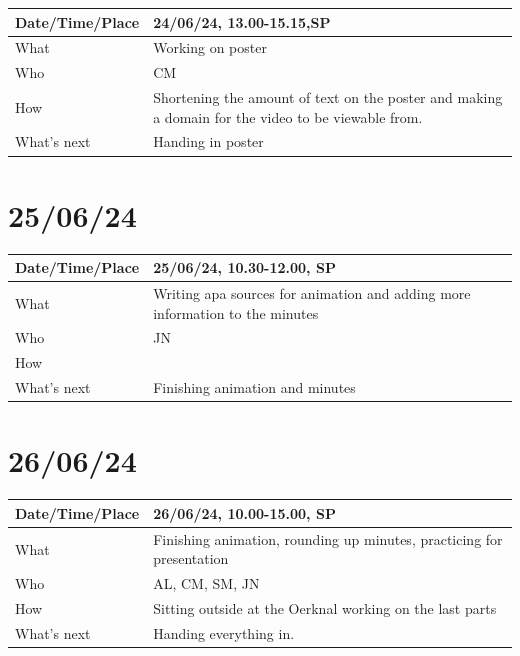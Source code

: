 \documentclass{article}
\begin{document}
\begin{table}[H]
\begin{tabular}{|p{1.5in}|p{4in}|}
\hline
Date/Time/Place & 24/06/24, 13.00-15.15,SP \\ \hline
What            & Working on poster \\ \hline
Who             & CM \\ \hline
How             & Shortening the amount of text on the poster and making a domain for the video to be viewable from.\\ \hline
What's next     & Handing in poster \\ \hline
\end{tabular}
\end{table}

\section{25/06/24}

\begin{table}[H]
\begin{tabular}{|p{1.5in}|p{4in}|}
\hline
Date/Time/Place & 25/06/24, 10.30-12.00, SP \\ \hline
What            & Writing apa sources for animation and adding more information to the minutes \\ \hline
Who             & JN \\ \hline
How             &  \\ \hline
What's next     & Finishing animation and minutes \\ \hline
\end{tabular}
\end{table}

\section{26/06/24}

\begin{table}[H]
\begin{tabular}{|p{1.5in}|p{4in}|}
\hline
Date/Time/Place & 26/06/24, 10.00-15.00, SP \\ \hline
What            & Finishing animation, rounding up minutes, practicing for presentation \\ \hline
Who             & AL, CM, SM, JN \\ \hline
How             & Sitting outside at the Oerknal working on the last parts \\ \hline
What's next     & Handing everything in. \\ \hline
\end{tabular}
\end{table}
\end{document}
